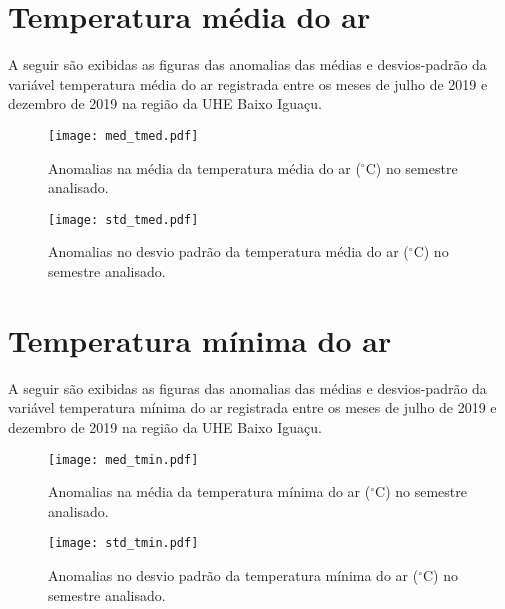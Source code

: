 \documentclass[a4paper,12pt]{article}
\begin{document}
        \section{Temperatura média do ar }
        \hspace{0.5cm} A seguir são exibidas as figuras das anomalias das médias e desvios-padrão da variável temperatura média do ar 
        registrada entre os meses de julho de 2019 e dezembro de 2019 na região da UHE Baixo Iguaçu.
        
        \begin{figure}[!htb]
        \centering
        \texttt{[image: med\_tmed.pdf]}
        \caption{Anomalias na média da temperatura média do ar ($^\circ$C) no semestre analisado.}
        \label{fig:figmed_tmed}
        \end{figure}
        
        \begin{figure}[!htb]
        \centering
        \texttt{[image: std\_tmed.pdf]}
        \caption{Anomalias no desvio padrão da temperatura média do ar ($^\circ$C) no semestre analisado.}
        \label{fig:figstd_tmed}
        \end{figure}  
        
        
        \newpage
        
        \section{Temperatura mínima do ar }
        \hspace{0.5cm} A seguir são exibidas as figuras das anomalias das médias e desvios-padrão da variável temperatura mínima do ar 
        registrada entre os meses de julho de 2019 e dezembro de 2019 na região da UHE Baixo Iguaçu.
        
        \begin{figure}[!htb]
        \centering
        \texttt{[image: med\_tmin.pdf]}
        \caption{Anomalias na média da temperatura mínima do ar ($^\circ$C) no semestre analisado.}
        \label{fig:figmed_tmin}
        \end{figure}
        
        \begin{figure}[!htb]
        \centering
        \texttt{[image: std\_tmin.pdf]}
        \caption{Anomalias no desvio padrão da temperatura mínima do ar ($^\circ$C) no semestre analisado.}
        \label{fig:figstd_tmin}
        \end{figure}  
        
\end{document}
